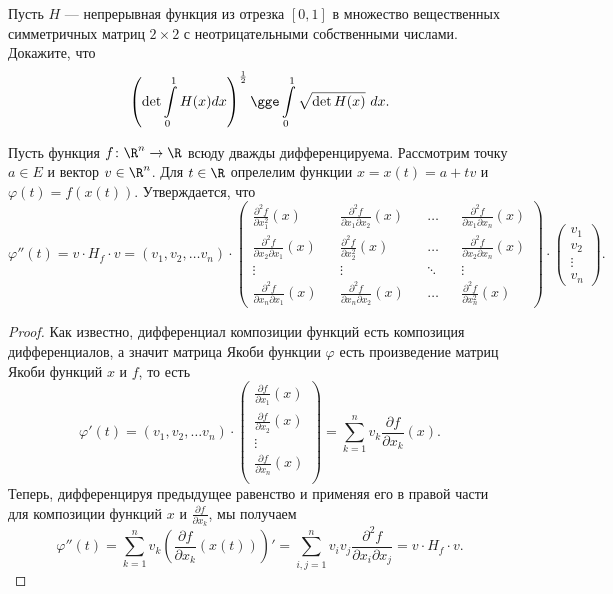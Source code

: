\documentclass[a4paper, 12pt]{article}
\newcommand{\vf}{\varphi}
\begin{document}
\renewcommand*{\arraystretch}{1}

\begin{problem}
    Пусть \(H\) --- непрерывная функция из отрезка \([0,1]\) в множество вещественных симметричных матриц \(2 \times 2\) с неотрицательными собственными числами. Докажите, что \[\left(\det \int\limits_0^1 H(x) dx\right)^\frac{1}{2} \gge \int\limits_0^1 \sqrt{\det H(x)} \ dx.\]
\end{problem}

\renewcommand*{\arraystretch}{1.6}

\begin{statement}\label{dd-form}
    Пусть функция \(f \colon \R^n \to \R\) всюду дважды дифференцируема. Рассмотрим точку \(a \in E\) и вектор \(v \in \R^n\). Для \(t \in \R\) опрелелим функции \(x = x(t) = a + tv\) и \(\vf(t) = f(x(t))\). Утверждается, что \[\vf''(t) = v \cdot H_f \cdot v = (v_1, v_2, \dots v_n) \cdot \begin{pmatrix}
        \frac{\partial^2 f}{\partial x_1^2}(x) && \frac{\partial^2 f}{\partial x_1 \partial x_2}(x) && \hdots && \frac{\partial^2 f}{\partial x_1 \partial x_n}(x) \\
        \frac{\partial^2 f}{\partial x_2 \partial x_1}(x) && \frac{\partial^2 f}{\partial x_2^2}(x) && \hdots && \frac{\partial^2 f}{\partial x_2 \partial x_n}(x) \\
        \vdots && \vdots && \ddots && \vdots \\
        \frac{\partial^2 f}{\partial x_n \partial x_1}(x) && \frac{\partial^2 f}{\partial x_n \partial x_2}(x) && \hdots && \frac{\partial^2 f}{\partial x_n^2}(x)
    \end{pmatrix} \cdot \begin{pmatrix}
        v_1\\
        v_2\\
        \vdots\\
        v_n
    \end{pmatrix}.\]
\end{statement}
\begin{proof}
    Как известно, дифференциал композиции функций есть композиция дифференциалов, а значит матрица Якоби функции \(\vf\) есть произведение матриц Якоби функций \(x\) и \(f\), то есть \[\vf'(t) = (v_1, v_2, \dots v_n) \cdot \begin{pmatrix}
        \frac{\partial f}{\partial x_1}(x)\\
        \frac{\partial f}{\partial x_2}(x)\\
        \vdots\\
        \frac{\partial f}{\partial x_n}(x)\\
    \end{pmatrix} = \sum\limits_{k = 1}^n v_k \frac{\partial f}{\partial x_k}(x).\] Теперь, дифференцируя предыдущее равенство и применяя его в правой части для композиции функций \(x\) и \(\frac{\partial f}{\partial x_k}\), мы получаем \[\vf''(t) = \sum\limits_{k = 1}^n v_k \left(\frac{\partial f}{\partial x_k}(x(t))\right)' = \sum\limits_{i, j = 1}^n v_i v_j \frac{\partial^2 f}{\partial x_i \partial x_j} = v \cdot H_f \cdot v.\]
\end{proof}
\end{document}
